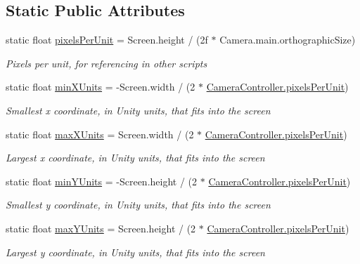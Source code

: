 \subsection*{Static Public Attributes}
\begin{DoxyCompactItemize}
\item 
static float \hyperlink{class_camera_controller_ae7f8453382d363abe462f24a4a025d77}{pixels\+Per\+Unit} = Screen.\+height / (2f $\ast$ Camera.\+main.\+orthographic\+Size)
\begin{DoxyCompactList}\small\item\em Pixels per unit, for referencing in other scripts \end{DoxyCompactList}\item 
static float \hyperlink{class_camera_controller_ac90d1e4d5543392c96f8cbcebac532f8}{min\+X\+Units} = -\/Screen.\+width / (2 $\ast$ \hyperlink{class_camera_controller_ae7f8453382d363abe462f24a4a025d77}{Camera\+Controller.\+pixels\+Per\+Unit})
\begin{DoxyCompactList}\small\item\em Smallest x coordinate, in Unity units, that fits into the screen \end{DoxyCompactList}\item 
static float \hyperlink{class_camera_controller_a42b69f34a276c249820bafba804521b8}{max\+X\+Units} = Screen.\+width / (2 $\ast$ \hyperlink{class_camera_controller_ae7f8453382d363abe462f24a4a025d77}{Camera\+Controller.\+pixels\+Per\+Unit})
\begin{DoxyCompactList}\small\item\em Largest x coordinate, in Unity units, that fits into the screen \end{DoxyCompactList}\item 
static float \hyperlink{class_camera_controller_a26974b89d53c6dc5c1e47faa2fc2657b}{min\+Y\+Units} = -\/Screen.\+height / (2 $\ast$ \hyperlink{class_camera_controller_ae7f8453382d363abe462f24a4a025d77}{Camera\+Controller.\+pixels\+Per\+Unit})
\begin{DoxyCompactList}\small\item\em Smallest y coordinate, in Unity units, that fits into the screen \end{DoxyCompactList}\item 
static float \hyperlink{class_camera_controller_a85a5eec75550876c672aa0f67838ffad}{max\+Y\+Units} = Screen.\+height / (2 $\ast$ \hyperlink{class_camera_controller_ae7f8453382d363abe462f24a4a025d77}{Camera\+Controller.\+pixels\+Per\+Unit})
\begin{DoxyCompactList}\small\item\em Largest y coordinate, in Unity units, that fits into the screen \end{DoxyCompactList}\end{DoxyCompactItemize}


